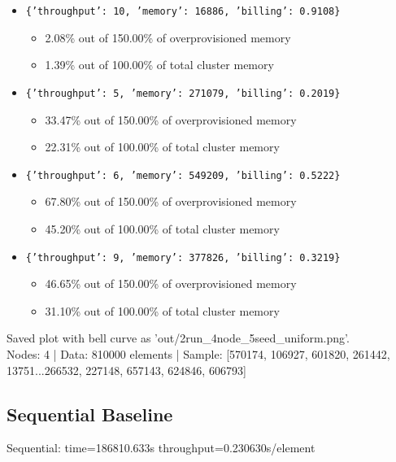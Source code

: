 \documentclass[]{interact}
\theoremstyle{plain}
\theoremstyle{definition}
\theoremstyle{remark}
\begin{document}
\begin{itemize}
    \item \texttt{\{'throughput': 10, 'memory': 16886, 'billing': 0.9108\}}
    \begin{itemize}
        \item 2.08\% out of 150.00\% of overprovisioned memory
        \item 1.39\% out of 100.00\% of total cluster memory
    \end{itemize}
    \item \texttt{\{'throughput': 5, 'memory': 271079, 'billing': 0.2019\}}
    \begin{itemize}
        \item 33.47\% out of 150.00\% of overprovisioned memory
        \item 22.31\% out of 100.00\% of total cluster memory
    \end{itemize}
    \item \texttt{\{'throughput': 6, 'memory': 549209, 'billing': 0.5222\}}
    \begin{itemize}
        \item 67.80\% out of 150.00\% of overprovisioned memory
        \item 45.20\% out of 100.00\% of total cluster memory
    \end{itemize}
    \item \texttt{\{'throughput': 9, 'memory': 377826, 'billing': 0.3219\}}
    \begin{itemize}
        \item 46.65\% out of 150.00\% of overprovisioned memory
        \item 31.10\% out of 100.00\% of total cluster memory
    \end{itemize}
\end{itemize}

Saved plot with bell curve as 'out/2run\_4node\_5seed\_uniform.png'.\\
Nodes: 4 | Data: 810000 elements | Sample: [570174, 106927, 601820, 261442, 13751...266532, 227148, 657143, 624846, 606793]

\subsection{Sequential Baseline}
Sequential: time=186810.633\textmu s throughput=0.230630\textmu s/element
\end{document}
